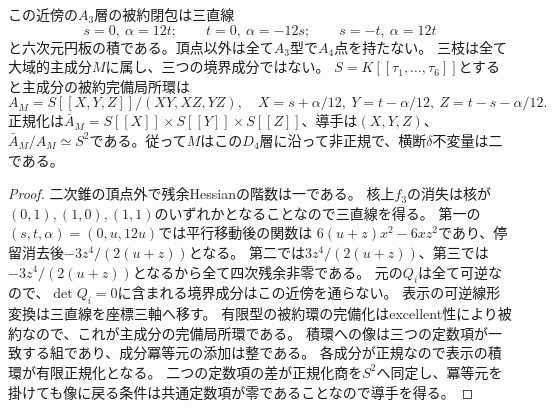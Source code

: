 \begin{proposition}
この近傍の$A_3$層の被約閉包は三直線
\[
 s=0,\ \alpha=12t;\qquad t=0,\ \alpha=-12s;\qquad
 s=-t,\ \alpha=12t
\]
と六次元円板の積である。頂点以外は全て$A_3$型で$A_4$点を持たない。
三枝は全て大域的主成分$M$に属し、三つの境界成分ではない。
$S=K[[\tau_1,\ldots,\tau_6]]$とすると主成分の被約完備局所環は
\[
 A_M=S[[X,Y,Z]]/(XY,XZ,YZ),\quad
 X=s+\alpha/12,\ Y=t-\alpha/12,\ Z=t-s-\alpha/12.
\]
正規化は$\bar A_M=S[[X]]\times S[[Y]]\times S[[Z]]$、導手は$(X,Y,Z)$、
$\bar A_M/A_M\simeq S^2$である。従って$M$はこの$D_4$層に沿って非正規で、横断$\delta$不変量は二である。
\end{proposition}
\begin{proof}
二次錐の頂点外で残余Hessianの階数は一である。
核上$f_3$の消失は核が$(0,1),(1,0),(1,1)$のいずれかとなることなので三直線を得る。
第一の$(s,t,\alpha)=(0,u,12u)$では平行移動後の関数は
$6(u+z)x^2-6xz^2$であり、停留消去後$-3z^4/(2(u+z))$となる。
第二では$3z^4/(2(u+z))$、第三では$-3z^4/(2(u+z))$となるから全て四次残余非零である。
元の$Q_i$は全て可逆なので、$\det Q_i=0$に含まれる境界成分はこの近傍を通らない。
表示の可逆線形変換は三直線を座標三軸へ移す。
有限型の被約環の完備化はexcellent性により被約なので、これが主成分の完備局所環である。
積環への像は三つの定数項が一致する組であり、成分冪等元の添加は整である。
各成分が正規なので表示の積環が有限正規化となる。
二つの定数項の差が正規化商を$S^2$へ同定し、冪等元を掛けても像に戻る条件は共通定数項が零であることなので導手を得る。
\end{proof}
